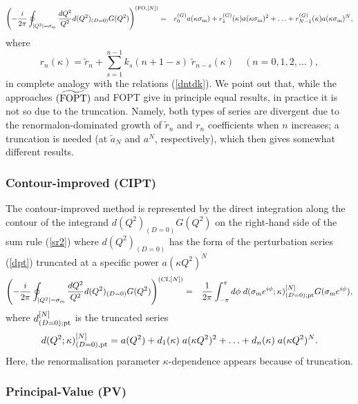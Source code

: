 \documentclass[aps,nofootinbib,showkeys,noshowpacs,preprintnumbers,amsmath,amssymb]{revtex4}
\def\be{\begin{equation}}
\def\ee{\end{equation}}
\def\bea{\begin{eqnarray}}
\def\eea{\end{eqnarray}}
\newcommand{\sm}{{\sigma_{\rm m}}}
\newcommand{\ta}{{\widetilde a}}
\newcommand{\tr}{{\widetilde r}}
\begin{document}
\bea
\left( -\frac{i}{2 \pi}   \oint_{|Q^2|=\sm}
\frac{d Q^2}{Q^2} d(Q^2)_{(D=0)} G(Q^2) \right)^{({\rm FO}, [N])} & = &
     r_0^{(G)} a(\kappa \sm) + r_1^{(G)}(\kappa) a(\kappa \sm)^2 + \ldots + r_{N-1}^{(G)}(\kappa) a(\kappa \sm)^{N},
  \label{sr2FO} \eea
 where 
\be
r_n(\kappa) = \tr_n + \sum_{s=1}^{n-1} k_s(n+1-s) \; \tr_{n-s}(\kappa) \quad
(n=0, 1,2, \ldots),
\label{rntrk} \ee
in complete analogy with the relations (\ref{dntdk}).
We point out that, while the approaches $(\widetilde{{\rm FOPT}})$ and FOPT give in principle equal results, in practice it is not so due to the truncation. Namely, both types of series are divergent due to the renormalon-dominated growth of ${\tr}_n$ and $r_n$ coefficients when $n$ increases; a truncation is needed (at $\ta_{N}$ and $a^N$, respectively), which then gives somewhat different results.

\subsubsection{Contour-improved (CIPT)}
\label{ssubs:CI}

The contour-improved method is represented by the direct integration along the contour of the integrand $d(Q^2)_{(D=0)} G(Q^2)$ on the right-hand side of the sum rule (\ref{sr2}) where $d(Q^2)_{(D=0)}$ has the form of the perturbation series (\ref{dpt}) truncated at a specific power $a(\kappa Q^2)^N$
\bea
\left( -\frac{i}{2 \pi}   \oint_{|Q^2|=\sm}
\frac{d Q^2}{Q^2} d(Q^2)_{(D=0)} G(Q^2) \right)^{({\rm CI},[N])} & = &
\frac{1}{2 \pi} \int_{-\pi}^{\pi} d \phi \; d(\sm e^{i \phi}; \kappa)^{[N]}_{(D=0); {\rm pt}}  G(\sm  e^{i \phi}),
\label{sr2CI} \eea
where $d^{[N]}_{(D=0); \rm pt}$ is the truncated series
\be
d(Q^2; \kappa)^{[N]}_{(D=0), {\rm pt}}= a(Q^2) + d_1(\kappa) \; a(\kappa Q^2)^2 + \ldots + d_n(\kappa) \; a(\kappa Q^2)^{N}.
\label{dNpt} \ee
Here, the renormalisation parameter $\kappa$-dependence appears because of truncation. 

\subsubsection{Principal-Value (PV)}
\label{ssubs:PV}
\end{document}
